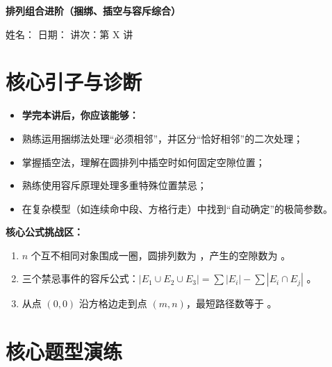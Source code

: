 \documentclass[11pt,a4paper]{ctexart}
\newcommand{\lessoninfo}[4]{%
  \begin{center}
    {\LARGE\bfseries #1}\par
    \vspace{0.8em}
    {\small 姓名：#2 \quad 日期：#3 \quad 讲次：#4}
  \end{center}
  \vspace{0.6em}
}
\begin{document}
\lessoninfo{排列组合进阶（捆绑、插空与容斥综合）}{\blank{2.6cm}}{\blank{2.6cm}}{第 X 讲}

\section{核心引子与诊断}

\begin{itemize}[itemsep=0.3em]
  \item \textbf{学完本讲后，你应该能够：}
  \item 熟练运用捆绑法处理“必须相邻”，并区分“恰好相邻”的二次处理；
  \item 掌握插空法，理解在圆排列中插空时如何固定空隙位置；
  \item 熟练使用容斥原理处理多重特殊位置禁忌；
  \item 在复杂模型（如连续命中段、方格行走）中找到“自动确定”的极简参数。
\end{itemize}


\vspace{1em}
\noindent\textbf{核心公式挑战区：}
\begin{enumerate}[itemsep=0.8em]
    \item $n$ 个互不相同对象围成一圈，圆排列数为 \blank{3cm}，产生的空隙数为 \blank{2cm}。
    \item 三个禁忌事件的容斥公式：$\lvert E_1\cup E_2\cup E_3\rvert = \sum |E_i| - \sum |E_i \cap E_j| $ \blank{3cm}。
    \item 从点 $(0,0)$ 沿方格边走到点 $(m,n)$，最短路径数等于 \blank{3cm}。
\end{enumerate}

\newpage

\section{核心题型演练}


{\small \qProbPermExactAdjStem}

{\small \qProbPermMultiForbidStem}
\end{document}
